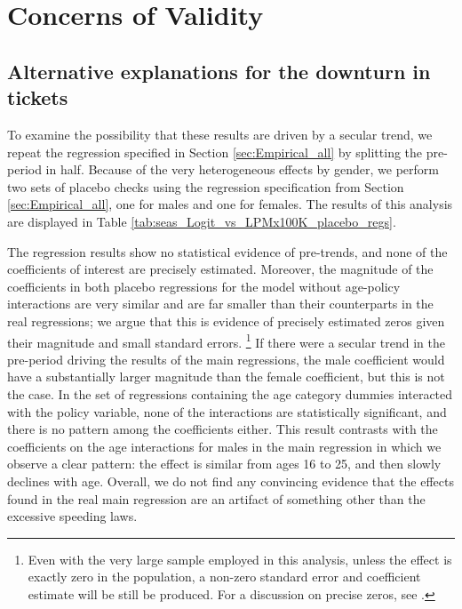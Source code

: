 \section{Concerns of Validity}
\label{sec:Validity}


\subsection{Alternative explanations for the downturn in tickets}

To examine the possibility that these results are driven by a secular trend, 
we repeat the regression specified in 
Section \ref{sec:Empirical_all} 
by splitting the pre-period in half. 
Because of the very heterogeneous effects by gender, 
we perform two sets of placebo checks using the regression specification from 
Section \ref{sec:Empirical_all}, 
one for males and one for females. 
The results of this analysis are displayed in 
Table \ref{tab:seas_Logit_vs_LPMx100K_placebo_regs}. 



The regression results show no statistical evidence of pre-trends, 
and none of the coefficients of interest are precisely estimated. 
Moreover, the magnitude of the coefficients in both placebo regressions 
for the model without age-policy interactions are very similar 
and are far smaller than their counterparts in the real regressions; 
we argue that this is evidence of precisely estimated zeros 
given their magnitude and small standard errors.%
\footnote{%
Even with the very large sample employed in this analysis, 
unless the effect is exactly zero in the population, 
a non-zero standard error and coefficient estimate will be still be produced. 
For a discussion on precise zeros, see 
\citet{penney2013}. 
}
%
If there were a secular trend in the pre-period driving the results of the main regressions, 
the male coefficient would have a substantially larger magnitude than the female coefficient, 
but this is not the case. 
In the set of regressions containing the age category dummies interacted with the policy variable, 
none of the interactions are statistically significant, and there is no pattern among the coefficients either.
This result contrasts with the coefficients on the age interactions for males 
in the main regression in which we observe a clear pattern: 
the effect is similar from ages 16 to 25, and then slowly declines with age. 
Overall, we do not find any convincing evidence that the effects found in the 
real main regression are an artifact of something other than the excessive speeding laws.


